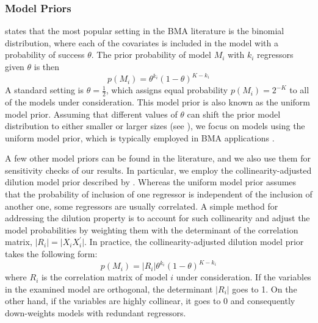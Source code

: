 \begin{refsection}
\subsubsection*{Model Priors}
\textcite{MoralBenito2012} states that the most popular setting in the \ac{BMA} literature is the binomial distribution, where each of the covariates is included in the model with a probability of success $\theta$. The prior probability of model $M_{i}$ with $k_{i}$ regressors given $\theta$ is then
\begin{equation}
p(M_{i})=\theta^{k_{i}}(1-\theta)^{K-k_{i}}
\end{equation}
A standard setting is $\theta=\frac{1}{2}$, which assigns equal probability $p(M_{i}) = 2^{-K}$ to all of the models under consideration. This model prior is also known as the uniform model prior. Assuming that different values of $\theta$ can shift the prior model distribution to either smaller or larger sizes (see \textcite{Zeugner2011}), we focus on models using the uniform model prior, which is typically employed in \ac{BMA} applications \textcite{Fernandezetal2001}.

A few other model priors can be found in the literature, and we also use them for sensitivity checks of our results. In particular, we employ the collinearity-adjusted dilution model prior described by \textcite{george2010}. Whereas the uniform model prior assumes that the probability of inclusion of one regressor is independent of the inclusion of another one, some regressors are usually correlated. A simple method for addressing the dilution property is to account for such collinearity and adjust the model probabilities by weighting them with the determinant of the correlation matrix, $\vert R_{i} \vert = \vert X_{i}^{}X_{i}^{\prime} \vert$. In practice, the collinearity-adjusted dilution model prior takes the following form:
%
\begin{equation}
p(M_{i})=\vert R_{i} \vert \theta^{k_{i}}(1-\theta)^{K-k_{i}}
\end{equation}
%
where $R_{i}$ is the correlation matrix of model $i$ under consideration. If the variables in the examined model are orthogonal, the determinant $\vert R_{i} \vert$ goes to 1. On the other hand, if the variables are highly collinear, it goes to 0 and consequently down-weights models with redundant regressors.


\end{refsection}

